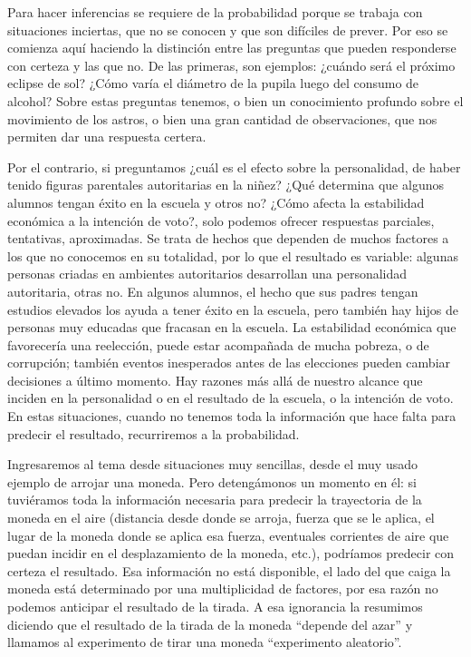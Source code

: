 \documentclass[]{book}
\begin{document}
Para hacer inferencias se requiere de la probabilidad porque se trabaja con situaciones inciertas, que no se conocen y que son difíciles de
prever. Por eso se comienza aquí haciendo la distinción entre las
preguntas que pueden responderse con certeza y las que no. De las
primeras, son ejemplos: ¿cuándo será el próximo eclipse de sol? ¿Cómo varía el diámetro de la pupila luego del consumo de alcohol?
Sobre estas preguntas tenemos, o bien un conocimiento profundo sobre el movimiento de los astros, o bien una gran cantidad de observaciones, que nos permiten dar una respuesta certera.

Por el contrario, si preguntamos ¿cuál es el efecto sobre la
personalidad, de haber tenido figuras parentales autoritarias en la
niñez? ¿Qué determina que algunos alumnos tengan éxito en la escuela y otros no? ¿Cómo afecta la estabilidad económica a la intención de voto?,
solo podemos ofrecer respuestas parciales, tentativas, aproximadas. Se
trata de hechos que dependen de muchos factores a los que no conocemos
en su totalidad, por lo que el resultado es variable: algunas personas
criadas en ambientes autoritarios desarrollan una personalidad
autoritaria, otras no. En algunos alumnos, el hecho que sus padres
tengan estudios elevados los ayuda a tener éxito en la escuela, pero
también hay hijos de personas muy educadas que fracasan en la escuela.
La estabilidad económica que favorecería una reelección, puede estar
acompañada de mucha pobreza, o de corrupción; también eventos
inesperados antes de las elecciones pueden cambiar decisiones a último
momento. Hay razones más allá de nuestro alcance que inciden en la
personalidad o en el resultado de la escuela, o la intención de voto. En
estas situaciones, cuando no tenemos toda la información que hace falta
para predecir el resultado, recurriremos a la probabilidad.

Ingresaremos al tema desde situaciones muy sencillas, desde el muy usado ejemplo de arrojar una moneda. Pero detengámonos un momento en él: si
tuviéramos toda la información necesaria para predecir la trayectoria de
la moneda en el aire (distancia desde donde se arroja, fuerza que se le
aplica, el lugar de la moneda donde se aplica esa fuerza, eventuales
corrientes de aire que puedan incidir en el desplazamiento de la moneda,
etc.), podríamos predecir con certeza el resultado. Esa información no
está disponible, el lado del que caiga la moneda está determinado por
una multiplicidad de factores, por esa razón no podemos anticipar el
resultado de la tirada. A esa ignorancia la resumimos diciendo que el
resultado de la tirada de la moneda ``depende del azar'' y llamamos al
experimento de tirar una moneda ``experimento aleatorio''.
\end{document}
